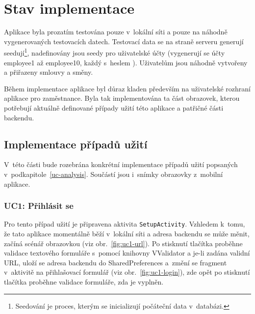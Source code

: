 \documentclass[twoside]{ctuthesis}
\begin{document}
\chapter{Stav implementace}

Aplikace byla prozatím testována pouze v~lokální síti a pouze na náhodně vygenerovaných testovacích datech. Testovací data se na straně serveru generují seedují\footnote{Seedování je proces, kterým se inicializují počáteční data v~databázi.}, nadefinovány jsou seedy pro uživatelské účty (vygenerují se účty employee1 až employee10, každý s~heslem ). Uživatelům jsou náhodně vytvořeny a přiřazeny smlouvy a směny.

Během implementace aplikace byl důraz kladen především na uživatelské rozhraní aplikace pro zaměstnance. Byla tak implementována ta část obrazovek, kterou potřebují aktuálně definované případy užití této aplikace a patřičné části backendu.

\section{Implementace případů užití}

V~této části bude rozebrána konkrétní implementace případů užití popsaných v~podkapitole~\ref{uc-analysis}. Součástí jsou i~snímky obrazovky z~mobilní aplikace.
\newpage

\subsection{UC1: Přihlásit se}
Pro tento případ užití je připravena aktivita \texttt{SetupActivity}. Vzhledem k~tomu, že tato aplikace momentálně běží v~lokální síti a adresa backendu se může měnit, začíná scénář obrazovkou  (viz obr.~\ref{fig:uc1-url}). Po stisknutí tlačítka  proběhne validace textového formuláře s~pomocí knihovny VValidator a je-li zadána validní URL, uloží se adresa backendu do SharedPreferences a~změní se fragment v~aktivitě na přihlašovací formulář (viz obr.~\ref{fig:uc1-login}), zde opět po stisknutí tlačítka  proběhne validace formuláře, zda je vyplněn.
\end{document}
